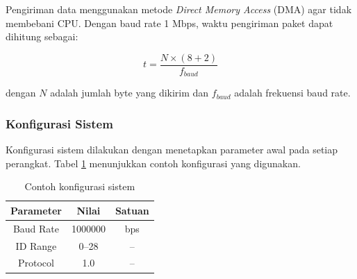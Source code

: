 Pengiriman data menggunakan metode \emph{Direct Memory Access} (DMA) agar tidak membebani CPU. Dengan baud rate 1 Mbps, waktu pengiriman paket dapat dihitung sebagai:

\begin{equation}
  \label{eq:waktu_komunikasi}
  t = \frac{N \times (8 + 2)}{f_{baud}}
\end{equation}

dengan $N$ adalah jumlah byte yang dikirim dan $f_{baud}$ adalah frekuensi baud rate.

\subsubsection{Konfigurasi Sistem}

Konfigurasi sistem dilakukan dengan menetapkan parameter awal pada setiap perangkat. Tabel \ref{tab:contoh_konfigurasi} menunjukkan contoh konfigurasi yang digunakan.

\begin{table}[H]
\centering
\caption{Contoh konfigurasi sistem}
\label{tab:contoh_konfigurasi}
\begin{tabular}{|c|c|c|}
\hline
\textbf{Parameter} & \textbf{Nilai} & \textbf{Satuan} \\
\hline
Baud Rate & 1000000 & bps \\
ID Range & 0--28 & -- \\
Protocol & 1.0 & -- \\
\hline
\end{tabular}
\end{table}
